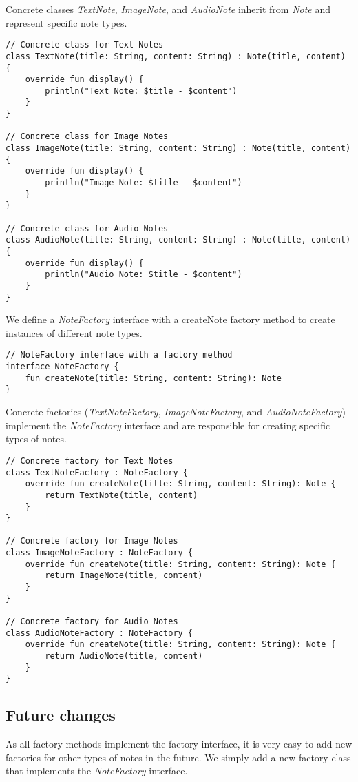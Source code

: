 Concrete classes \textsl{TextNote}, \textsl{ImageNote}, and \textsl{AudioNote} inherit from \textsl{Note} and represent specific note types.
\begin{lstlisting}
// Concrete class for Text Notes
class TextNote(title: String, content: String) : Note(title, content) {
	override fun display() {
		println("Text Note: $title - $content")
	}
}

// Concrete class for Image Notes
class ImageNote(title: String, content: String) : Note(title, content) {
	override fun display() {
		println("Image Note: $title - $content")
	}
}

// Concrete class for Audio Notes
class AudioNote(title: String, content: String) : Note(title, content) {
	override fun display() {
		println("Audio Note: $title - $content")
	}
}
\end{lstlisting}

We define a \textsl{NoteFactory} interface with a createNote factory method to create instances of different note types.
\begin{lstlisting}
// NoteFactory interface with a factory method
interface NoteFactory {
	fun createNote(title: String, content: String): Note
}
\end{lstlisting}

Concrete factories (\textsl{TextNoteFactory}, \textsl{ImageNoteFactory}, and \textsl{AudioNoteFactory}) implement the \textsl{NoteFactory} interface and are responsible for creating specific types of notes.
\begin{lstlisting}
// Concrete factory for Text Notes
class TextNoteFactory : NoteFactory {
	override fun createNote(title: String, content: String): Note {
		return TextNote(title, content)
	}
}

// Concrete factory for Image Notes
class ImageNoteFactory : NoteFactory {
	override fun createNote(title: String, content: String): Note {
		return ImageNote(title, content)
	}
}

// Concrete factory for Audio Notes
class AudioNoteFactory : NoteFactory {
	override fun createNote(title: String, content: String): Note {
		return AudioNote(title, content)
	}
}
\end{lstlisting}


\subsection*{Future changes}
As all factory methods implement the factory interface, it is very easy to add new factories for other types of notes in the future. We simply add a new factory class that implements the \textsl{NoteFactory} interface.
